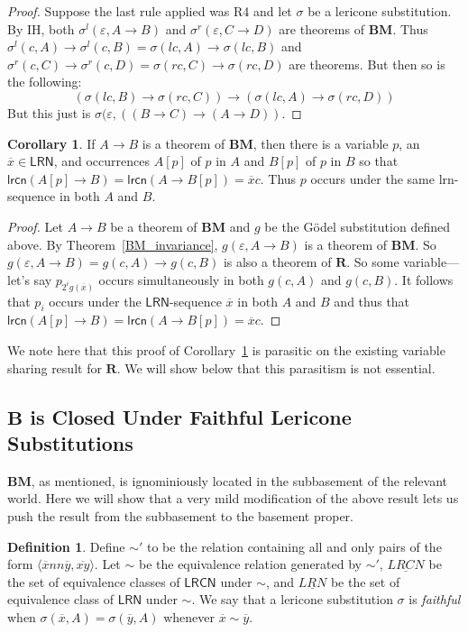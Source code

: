 \documentclass{amsart}
\theoremstyle{definition}
\newtheorem{cor}{Corollary}
\newtheorem{mdef}{Definition}
\newcommand{\LRN}{\mathsf{LRN}}
\newcommand{\lrcn}{\mathsf{lrcn}}
\newcommand{\LRCN}{\mathsf{LRCN}}
\newcommand{\BM}{\mathbf{BM}}
\newcommand{\logic}[1]{{\ensuremath {\mathbf{#1}}}}
\begin{document}
\begin{proof}
    Suppose the last rule applied was R4 and let $\sigma$ be a lericone substitution. By IH, both $\sigma^l(\varepsilon,A\to B)$ and $\sigma^r(\varepsilon,C\to D)$ are theorems of $\BM$. Thus $\sigma^l(c,A)\to\sigma^l(c,B)=\sigma(lc,A)\to\sigma(lc,B)$ and $\sigma^r(c,C)\to\sigma^r(c,D)=\sigma(rc,C)\to\sigma(rc,D)$ are theorems. But then so is the following:
    \begin{displaymath}
        (\sigma(lc,B)\to\sigma(rc,C))\to(\sigma(lc,A)\to\sigma(rc,D))
    \end{displaymath}
    But this just is $\sigma(\varepsilon,((B\to C)\to(A\to D))$.
\end{proof}

\begin{cor}\label{BM_var_shar}
    If $A\to B$ is a theorem of $\BM$, then there is a variable $p$, an $\overline{x}\in\LRN$, and occurrences $A[p]$ of $p$ in $A$ and $B[p]$ of $p$ in $B$ so that $\lrcn(A[p]\to B)=\lrcn(A\to B[p])=\overline{x}c$. Thus $p$ occurs under the same lrn-sequence in both $A$ and $B$. 
\end{cor}
\begin{proof}
    Let $A\to B$ be a theorem of $\BM$ and $g$ be the G\"odel substitution defined above. By Theorem~\ref{BM_invariance}, $g(\varepsilon,A\to B)$ is a theorem of $\BM$. So $g(\varepsilon,A\to B)=g(c,A)\to g(c,B)$ is also a theorem of $\mathbf{R}$. So some variable---let's say $p_{2^ig(\overline{x})}$ occurs simultaneously in both $g(c,A)$ and $g(c,B)$. It follows that $p_i$ occurs under the $\LRN$-sequence $\overline{x}$ in both $A$ and $B$ and thus that $\lrcn(A[p]\to B)=\lrcn(A\to B[p])=\overline{x}c$.
\end{proof}

We note here that this proof of Corollary~\ref{BM_var_shar} is parasitic on the existing variable sharing result for $\mathbf{R}$. We will show below that this parasitism is not essential.

\subsection{$\logic{B}$ is Closed Under Faithful Lericone Substitutions}

$\BM$, as mentioned, is ignominiously located in the subbasement of the relevant world. Here we will show that a very mild modification of the above result lets us push the result from the subbasement to the basement proper.

\begin{mdef}
    Define $\sim'$ to be the relation containing all and only pairs of the form $\langle \overline{x}nn\overline{y}, \overline{xy} \rangle$. Let $\sim$ be the equivalence relation generated by $\sim'$, $\underline{LRCN}$ be the set of equivalence classes of $\LRCN$ under $\sim$, and $\underline{LRN}$ be the set of equivalence class of $\LRN$ under $\sim$. We say that a lericone substitution $\sigma$ is \textit{faithful} when $\sigma(\overline{x},A)=\sigma(\overline{y},A)$ whenever $\overline{x}\sim\overline{y}$. 
\end{mdef}
\end{document}
